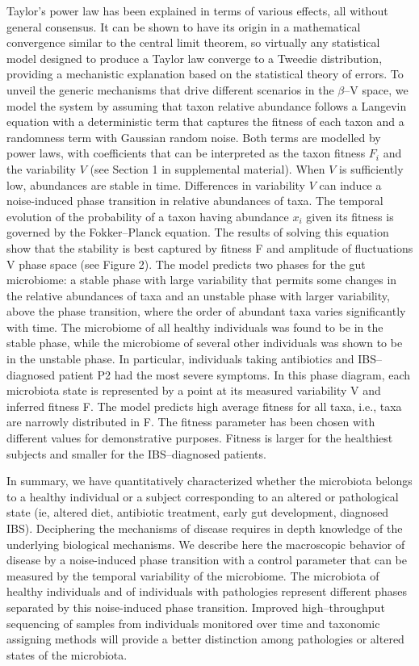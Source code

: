 \documentclass[12pt]{article}
\begin{document}
Taylor's power law has been explained in terms of various effects, all without general consensus. It can be shown to have its origin in a mathematical convergence similar to the central limit theorem, so virtually any statistical model designed to produce a Taylor law converge to a Tweedie distribution\cite{stat}, providing a mechanistic explanation based on the statistical theory of errors\cite{convergence1,convergence2,convergence3}. To unveil the generic mechanisms that drive different scenarios in the $\beta$--V space, we model the system by assuming that taxon relative abundance follows a Langevin equation with a deterministic term that captures the fitness of each taxon and a randomness term with Gaussian random noise\cite{ranking}. Both terms are modelled by power laws, with coefficients that can be interpreted as the taxon fitness $F_i$ and the variability $V$ (see Section 1 in supplemental material). When $V$ is sufficiently low, abundances are stable in time.  Differences in variability $V$ can induce a noise-induced phase transition in relative abundances of taxa. The temporal evolution of the probability of a taxon having abundance $x_i$ given its fitness is governed by the Fokker--Planck equation. The results of solving this equation show that  the stability is best captured by fitness F and amplitude of fluctuations V phase space (see Figure 2). 
The model predicts two phases for the gut microbiome: a stable phase with large variability that permits some changes in the relative abundances of taxa and an unstable phase with larger variability, above the phase transition, where the order of abundant taxa varies significantly with time. The microbiome of all healthy individuals was found to be in the stable phase, while the microbiome of several other individuals was shown to be in the unstable phase. In particular, individuals taking antibiotics and IBS--diagnosed patient P2 had the most severe symptoms. In this phase diagram, each microbiota state is represented by a point at its measured variability V and inferred fitness F. The model predicts high average fitness for all taxa, i.e., taxa are narrowly distributed in F. The fitness parameter has been chosen with different values for demonstrative purposes. Fitness is larger for the healthiest subjects and smaller for the IBS--diagnosed patients.  

In summary, we have quantitatively characterized whether the microbiota belongs to a healthy individual or a subject corresponding to an altered or pathological state (ie, altered diet, antibiotic treatment, early gut development, diagnosed IBS). Deciphering the mechanisms of disease requires in depth knowledge of the underlying biological mechanisms. We describe here the macroscopic behavior of disease by a noise-induced phase transition with a control parameter that can be measured by the temporal variability of the microbiome. The microbiota of healthy individuals and of individuals with pathologies represent different phases separated by this noise-induced phase transition. Improved high--throughput sequencing of samples from individuals monitored over time and taxonomic assigning methods will provide a better distinction among pathologies or altered states of the microbiota. 
\end{document}
